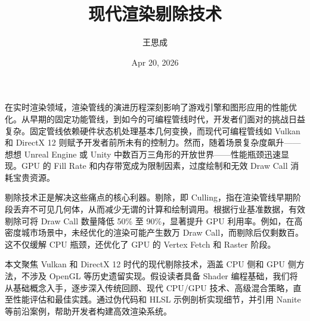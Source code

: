 \title{现代渲染剔除技术}
\author{王思成}
\date{Apr 20, 2026}
\maketitle
在实时渲染领域，渲染管线的演进历程深刻影响了游戏引擎和图形应用的性能优化。从早期的固定功能管线，到如今的可编程管线时代，开发者们面对的挑战日益复杂。固定管线依赖硬件状态机处理基本几何变换，而现代可编程管线如 Vulkan 和 DirectX 12 则赋予开发者前所未有的控制力。然而，随着场景复杂度飙升——想想 Unreal Engine 或 Unity 中数百万三角形的开放世界——性能瓶颈迅速显现。GPU 的 Fill Rate 和内存带宽成为限制因素，过度绘制和无效 Draw Call 消耗宝贵资源。\par
剔除技术正是解决这些痛点的核心利器。剔除，即 Culling，指在渲染管线早期阶段丢弃不可见几何体，从而减少无谓的计算和绘制调用。根据行业基准数据，有效剔除可将 Draw Call 数量降低 50\%{} 至 90\%{}，显著提升 GPU 利用率。例如，在高密度城市场景中，未经优化的渲染可能产生数万 Draw Call，而剔除后仅剩数百。这不仅缓解 CPU 瓶颈，还优化了 GPU 的 Vertex Fetch 和 Raster 阶段。\par
本文聚焦 Vulkan 和 DirectX 12 时代的现代剔除技术，涵盖 CPU 侧和 GPU 侧方法，不涉及 OpenGL 等历史遗留实现。假设读者具备 Shader 编程基础，我们将从基础概念入手，逐步深入传统回顾、现代 CPU/GPU 技术、高级混合策略，直至性能评估和最佳实践。通过伪代码和 HLSL 示例剖析实现细节，并引用 Nanite 等前沿案例，帮助开发者构建高效渲染系统。\par
